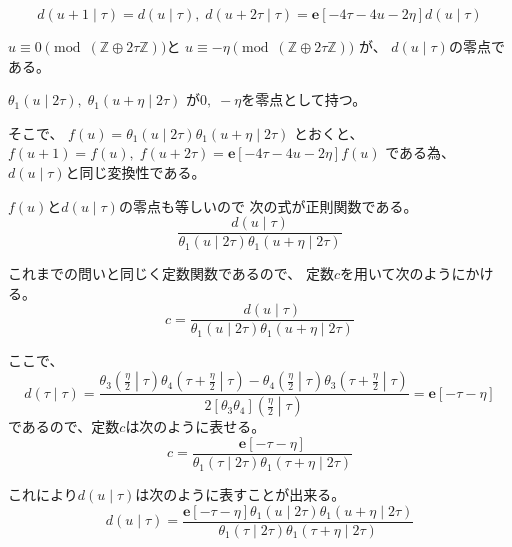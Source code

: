 \documentclass[12pt,b5paper]{ltjsarticle}
\begin{document}
\begin{enumerate}
         \begin{equation}
          d(u+1 \mid \tau) = d(u \mid \tau)
           ,\;
          d(u+2\tau \mid \tau) = \mathbf{e}[-4\tau-4u-2\eta]d(u \mid \tau)
         \end{equation}


         $u\equiv 0 \pmod{(\mathbb{Z} \oplus 2\tau\mathbb{Z})}$と
         $u\equiv -\eta \pmod{(\mathbb{Z} \oplus 2\tau\mathbb{Z})}$
         が、
         $d(u\mid\tau)$の零点である。

         $\theta_{1}(u\mid2\tau),\;\theta_{1}(u+\eta\mid2\tau)$
         が$0,\;-\eta$を零点として持つ。

         そこで、
         $f(u)=\theta_{1}(u\mid2\tau) \theta_{1}(u+\eta\mid2\tau)$
         とおくと、
         $f(u+1)=f(u),\;f(u+2\tau)=\mathbf{e}[-4\tau-4u-2\eta]f(u)$
         である為、
         $d(u\mid\tau)$と同じ変換性である。

         $f(u)$と$d(u\mid\tau)$の零点も等しいので
         次の式が正則関数である。
         \begin{equation}
          \frac{d(u\mid\tau)}{\theta_{1}(u\mid2\tau) \theta_{1}(u+\eta\mid2\tau)}
         \end{equation}

         これまでの問いと同じく定数関数であるので、
         定数$c$を用いて次のようにかける。
         \begin{equation}
          c=\frac{d(u\mid\tau)}{\theta_{1}(u\mid2\tau) \theta_{1}(u+\eta\mid2\tau)}
         \end{equation}

         ここで、
         \begin{equation}
          d(\tau \mid \tau)=
           \frac{
           \theta_{3}\left( \frac{\eta}{2} \middle| \tau \right)
           \theta_{4}\left( \tau+\frac{\eta}{2} \middle| \tau \right)
           -\theta_{4}\left( \frac{\eta}{2} \middle| \tau \right)
           \theta_{3}\left( \tau+\frac{\eta}{2} \middle| \tau \right)
           }{
           2[\theta_{3}\theta_{4}]\left( \frac{\eta}{2} \middle| \tau \right)
           }
           =\mathbf{e}[-\tau-\eta]
         \end{equation}
         であるので、定数$c$は次のように表せる。
         \begin{equation}
          c=\frac{\mathbf{e}[-\tau-\eta]}{\theta_{1}(\tau\mid2\tau) \theta_{1}(\tau+\eta\mid2\tau)}
         \end{equation}

         これにより$d(u\mid\tau)$は次のように表すことが出来る。
         \begin{equation}
          d(u\mid\tau)=
           \frac{\mathbf{e}[-\tau-\eta]\theta_{1}(u\mid2\tau) \theta_{1}(u+\eta\mid2\tau)}{\theta_{1}(\tau\mid2\tau) \theta_{1}(\tau+\eta\mid2\tau)}
         \end{equation}

    \hrulefill

\end{enumerate}
\end{document}
